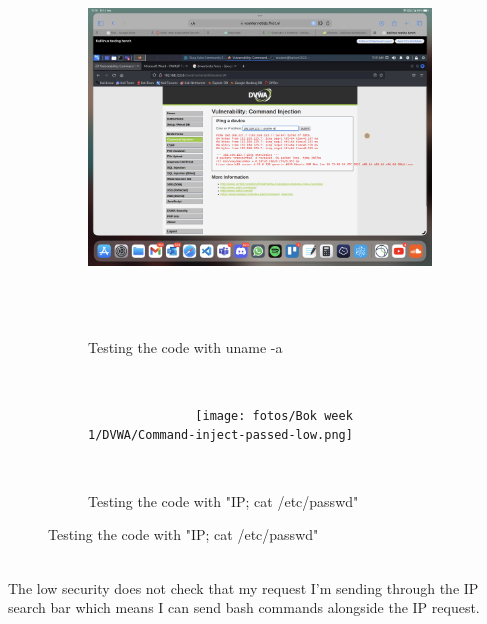 \documentclass[12pt, letterpaper]{article}
\begin{document}
\begin{figure}[!ht]
    \begin{subfigure}{.5\textwidth}
        \centering
        \includegraphics[width=1\textwidth]{fotos/Bok week 1/DVWA/Command-injection-tested-loitering-low.jpeg}
        \caption{Testing the code with uname -a}
        \label{fig:sub1}
    \end{subfigure}%
    \begin{subfigure}{.5\textwidth}
        \centering
        \texttt{[image: fotos/Bok week 1/DVWA/Command-inject-passed-low.png]}
        \caption{Testing the code with "IP; cat /etc/passwd"}
        \label{fig:sub2}
    \end{subfigure}
\end{figure}\mbox{}\\
\hfill\break
The low security does not check that my request I'm sending through the IP search bar which means I can send bash commands alongside the IP request.
\newpage
\end{document}
